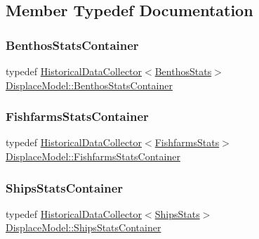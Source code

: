 \subsection{Member Typedef Documentation}
\mbox{\label{class_displace_model_a58dc0cf9a12cf5a26c28dfdddd3f36ba}} 
\subsubsection{\texorpdfstring{BenthosStatsContainer}{BenthosStatsContainer}}
{\footnotesize\ttfamily typedef \mbox{\hyperlink{class_historical_data_collector}{Historical\+Data\+Collector}}$<$\mbox{\hyperlink{class_benthos_stats}{Benthos\+Stats}}$>$ \mbox{\hyperlink{class_displace_model_a58dc0cf9a12cf5a26c28dfdddd3f36ba}{Displace\+Model\+::\+Benthos\+Stats\+Container}}}

\mbox{\label{class_displace_model_a79e0e2511f2c59cd7d5e8518ffc8ab17}} 
\subsubsection{\texorpdfstring{FishfarmsStatsContainer}{FishfarmsStatsContainer}}
{\footnotesize\ttfamily typedef \mbox{\hyperlink{class_historical_data_collector}{Historical\+Data\+Collector}}$<$\mbox{\hyperlink{class_fishfarms_stats}{Fishfarms\+Stats}}$>$ \mbox{\hyperlink{class_displace_model_a79e0e2511f2c59cd7d5e8518ffc8ab17}{Displace\+Model\+::\+Fishfarms\+Stats\+Container}}}

\mbox{\label{class_displace_model_a726f3fa27d4963a1cf7a396b26c64a4e}} 
\subsubsection{\texorpdfstring{ShipsStatsContainer}{ShipsStatsContainer}}
{\footnotesize\ttfamily typedef \mbox{\hyperlink{class_historical_data_collector}{Historical\+Data\+Collector}}$<$\mbox{\hyperlink{class_ships_stats}{Ships\+Stats}}$>$ \mbox{\hyperlink{class_displace_model_a726f3fa27d4963a1cf7a396b26c64a4e}{Displace\+Model\+::\+Ships\+Stats\+Container}}}



